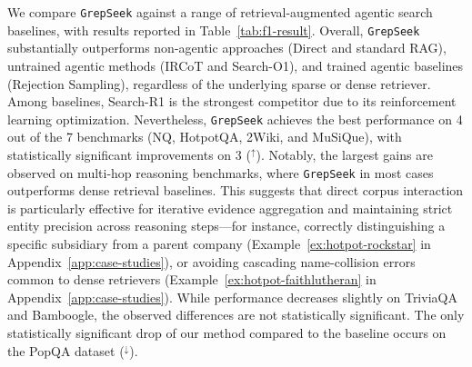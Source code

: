 \documentclass{llmxive}
\providecommand{\ourmethod}{\texttt{GrepSeek}\xspace}
\begin{document}
We compare \ourmethod{} against a range of retrieval-augmented agentic search baselines, with results reported in Table~\ref{tab:f1-result}. Overall, \ourmethod{} substantially outperforms non-agentic approaches (Direct and standard RAG), untrained agentic methods (IRCoT and Search-O1), and trained agentic baselines (Rejection Sampling), regardless of the underlying sparse or dense retriever. Among baselines, Search-R1 is the strongest competitor due to its reinforcement learning optimization. Nevertheless, \ourmethod{} achieves the best performance on 4 out of the 7 benchmarks (NQ, HotpotQA, 2Wiki, and MuSiQue), with statistically significant improvements on 3 ($^\uparrow$). Notably, the largest gains are observed on multi-hop reasoning benchmarks, where \ourmethod{} in most cases outperforms dense retrieval baselines. This suggests that direct corpus interaction is particularly effective for iterative evidence aggregation and maintaining strict entity precision across reasoning steps---for instance, correctly distinguishing a specific subsidiary from a parent company (Example~\ref{ex:hotpot-rockstar} in Appendix~\ref{app:case-studies}), or avoiding cascading name-collision errors common to dense retrievers (Example~\ref{ex:hotpot-faithlutheran} in Appendix~\ref{app:case-studies}). While performance decreases slightly on TriviaQA and Bamboogle, the observed differences are not statistically significant. The only statistically significant drop of our method compared to the baseline occurs on the PopQA dataset ($^\downarrow$).
\end{document}
